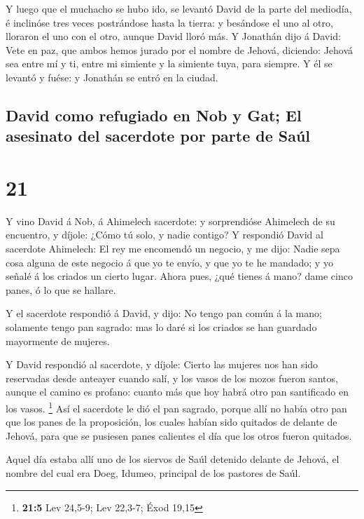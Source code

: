  Y luego que el muchacho se hubo ido, se levantó David de
la parte del mediodía, é inclinóse tres veces postrándose hasta la
tierra: y besándose el uno al otro, lloraron el uno con el otro, aunque
David lloró más.  Y Jonathán dijo á David: Vete en paz, que
ambos hemos jurado por el nombre de Jehová, diciendo: Jehová sea entre
mí y ti, entre mi simiente y la simiente tuya, para siempre. Y él se
levantó y fuése: y Jonathán se entró en la ciudad.

\hypertarget{david-como-refugiado-en-nob-y-gat-el-asesinato-del-sacerdote-por-parte-de-sauxfal}{%
\subsection{David como refugiado en Nob y Gat; El asesinato del
sacerdote por parte de
Saúl}\label{david-como-refugiado-en-nob-y-gat-el-asesinato-del-sacerdote-por-parte-de-sauxfal}}

\hypertarget{section-20}{%
\section{21}\label{section-20}}

 Y vino David á Nob, á Ahimelech sacerdote: y sorprendióse
Ahimelech de su encuentro, y díjole: ¿Cómo tú solo, y nadie contigo?
 Y respondió David al sacerdote Ahimelech: El rey me
encomendó un negocio, y me dijo: Nadie sepa cosa alguna de este negocio
á que yo te envío, y que yo te he mandado; y yo señalé á los criados un
cierto lugar.  Ahora pues, ¿qué tienes á mano? dame cinco
panes, ó lo que se hallare.

 Y el sacerdote respondió á David, y dijo: No tengo pan
común á la mano; solamente tengo pan sagrado: mas lo daré si los criados
se han guardado mayormente de mujeres.

 Y David respondió al sacerdote, y díjole: Cierto las
mujeres nos han sido reservadas desde anteayer cuando salí, y los vasos
de los mozos fueron santos, aunque el camino es profano: cuanto más que
hoy habrá otro pan santificado en los vasos. \footnote{\textbf{21:5} Lev
  24,5-9; Lev 22,3-7; Éxod 19,15}  Así el sacerdote le dió
el pan sagrado, porque allí no había otro pan que los panes de la
proposición, los cuales habían sido quitados de delante de Jehová, para
que se pusiesen panes calientes el día que los otros fueron quitados.

 Aquel día estaba allí uno de los siervos de Saúl detenido
delante de Jehová, el nombre del cual era Doeg, Idumeo, principal de los
pastores de Saúl.

